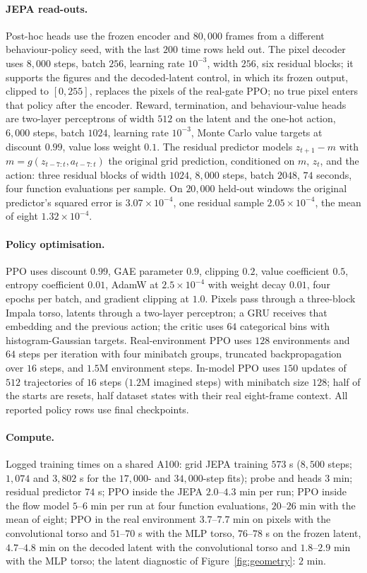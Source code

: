 \paragraph{JEPA read-outs.}
Post-hoc heads use the frozen encoder and $80{,}000$ frames from a different behaviour-policy seed,
with the last $200$ time rows held out. The pixel decoder uses $8{,}000$ steps, batch $256$, learning
rate $10^{-3}$, width $256$, six residual blocks; it supports the figures and the decoded-latent control, in which its frozen output, clipped to $[0,255]$, replaces the pixels of the real-gate PPO; no true pixel enters that policy after the encoder. Reward,
termination, and behaviour-value heads are two-layer perceptrons of width $512$ on the latent and the
one-hot action, $6{,}000$ steps, batch $1024$, learning rate $10^{-3}$, Monte Carlo value targets at
discount $0.99$, value loss weight $0.1$. The residual predictor models $z_{t+1}-m$ with
$m=g(z_{t-7:t},a_{t-7:t})$ the original grid prediction, conditioned on $m$, $z_t$, and the action:
three residual blocks of width $1024$, $8{,}000$ steps, batch $2048$, $74$ seconds, four function
evaluations per sample. On $20{,}000$ held-out windows the original predictor's squared error is
$3.07\times10^{-4}$, one residual sample $2.05\times10^{-4}$, the mean of eight $1.32\times10^{-4}$.

\paragraph{Policy optimisation.}
PPO uses discount $0.99$, GAE parameter $0.9$, clipping $0.2$, value coefficient $0.5$, entropy
coefficient $0.01$, AdamW at $2.5\times10^{-4}$ with weight decay $0.01$, four epochs per batch, and
gradient clipping at $1.0$. Pixels pass through a three-block Impala torso, latents through a two-layer
perceptron; a GRU receives that embedding and the previous action; the critic uses $64$ categorical
bins with histogram-Gaussian targets. Real-environment PPO uses $128$ environments and $64$ steps per
iteration with four minibatch groups, truncated backpropagation over $16$ steps, and $1.5$M
environment steps. In-model PPO uses $150$ updates of $512$ trajectories of $16$ steps ($1.2$M
imagined steps) with minibatch size $128$; half of the starts are resets, half dataset states with
their real eight-frame context. All reported policy rows use final checkpoints.

\paragraph{Compute.} Logged training times on a shared A100: grid JEPA training $573$ s ($8{,}500$
steps; $1{,}074$ and $3{,}802$ s for the $17{,}000$- and $34{,}000$-step fits); probe and heads $3$
min; residual predictor $74$ s; PPO inside the JEPA $2.0$--$4.3$ min per run; PPO inside the flow model
$5$--$6$ min per run at four function evaluations, $20$--$26$ min with the mean of eight; PPO in the real environment $3.7$--$7.7$ min on pixels with the convolutional torso and $51$--$70$ s with the MLP torso, $76$--$78$ s on the frozen latent, $4.7$--$4.8$ min on the decoded latent with the convolutional torso and $1.8$--$2.9$ min with the MLP torso; the latent diagnostic of Figure~\ref{fig:geometry}: $2$ min.

